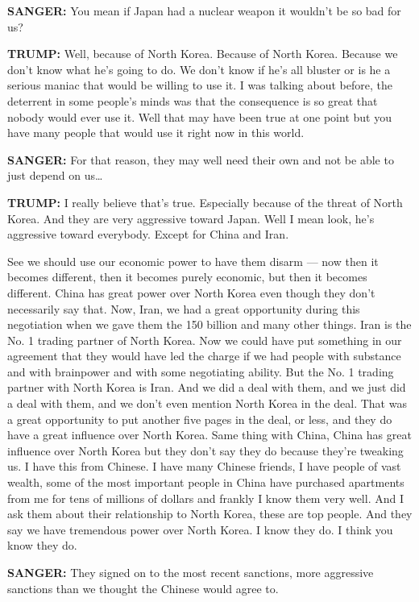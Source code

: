 \textbf{SANGER:} You mean if Japan had a nuclear weapon it wouldn't be
so bad for us?

\textbf{TRUMP:} Well, because of North Korea. Because of North Korea.
Because we don't know what he's going to do. We don't know if he's all
bluster or is he a serious maniac that would be willing to use it. I was
talking about before, the deterrent in some people's minds was that the
consequence is so great that nobody would ever use it. Well that may
have been true at one point but you have many people that would use it
right now in this world.

\textbf{SANGER:} For that reason, they may well need their own and not
be able to just depend on us\ldots{}

\textbf{TRUMP:} I really believe that's true. Especially because of the
threat of North Korea. And they are very aggressive toward Japan. Well I
mean look, he's aggressive toward everybody. Except for China and Iran.

See we should use our economic power to have them disarm --- now then it
becomes different, then it becomes purely economic, but then it becomes
different. China has great power over North Korea even though they don't
necessarily say that. Now, Iran, we had a great opportunity during this
negotiation when we gave them the 150 billion and many other things.
Iran is the No. 1 trading partner of North Korea. Now we could have put
something in our agreement that they would have led the charge if we had
people with substance and with brainpower and with some negotiating
ability. But the No. 1 trading partner with North Korea is Iran. And we
did a deal with them, and we just did a deal with them, and we don't
even mention North Korea in the deal. That was a great opportunity to
put another five pages in the deal, or less, and they do have a great
influence over North Korea. Same thing with China, China has great
influence over North Korea but they don't say they do because they're
tweaking us. I have this from Chinese. I have many Chinese friends, I
have people of vast wealth, some of the most important people in China
have purchased apartments from me for tens of millions of dollars and
frankly I know them very well. And I ask them about their relationship
to North Korea, these are top people. And they say we have tremendous
power over North Korea. I know they do. I think you know they do.

\textbf{SANGER:} They signed on to the most recent sanctions, more
aggressive sanctions than we thought the Chinese would agree to.

